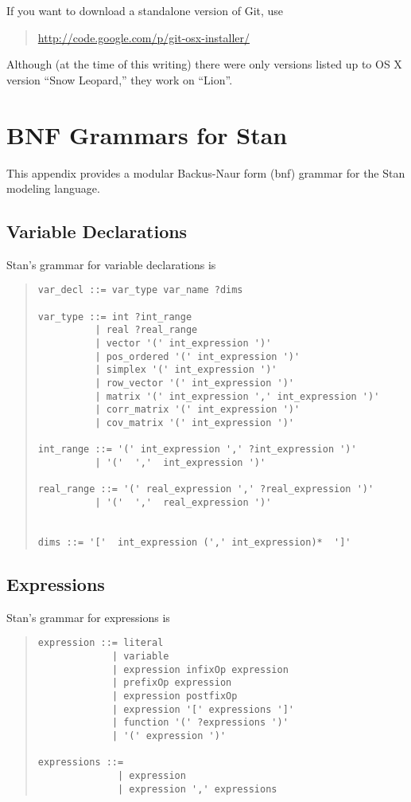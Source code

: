 \documentclass[10pt]{report}
\newcommand{\Stan}{Stan\xspace}
\newcommand{\acronym}[1]{{\sc #1}\xspace}
\newcommand{\BNF}{\acronym{bnf}}
\begin{document}
If you want to download a standalone version of Git, use

\begin{quote}
\url{http://code.google.com/p/git-osx-installer/}
\end{quote}

Although (at the time of this writing) there were only versions listed
up to OS X version ``Snow Leopard,'' they work on ``Lion''.

\chapter{BNF Grammars for \Stan}

This appendix provides a modular Backus-Naur form (\BNF) grammar for
the \Stan modeling language.

\section{Variable Declarations}

\Stan's grammar for variable declarations is
%
\begin{quote}
\begin{Verbatim}
var_decl ::= var_type var_name ?dims

var_type ::= int ?int_range
          | real ?real_range
          | vector '(' int_expression ')'
          | pos_ordered '(' int_expression ')'
          | simplex '(' int_expression ')'
          | row_vector '(' int_expression ')'
          | matrix '(' int_expression ',' int_expression ')'
          | corr_matrix '(' int_expression ')'
          | cov_matrix '(' int_expression ')'

int_range ::= '(' int_expression ',' ?int_expression ')'
          | '('  ','  int_expression ')'

real_range ::= '(' real_expression ',' ?real_expression ')'
          | '('  ','  real_expression ')'


dims ::= '['  int_expression (',' int_expression)*  ']'
\end{Verbatim}
\end{quote}

\section{Expressions}

\Stan's grammar for expressions is 
%
\begin{quote}
\begin{Verbatim}
expression ::= literal
             | variable
             | expression infixOp expression
             | prefixOp expression
             | expression postfixOp
             | expression '[' expressions ']'
             | function '(' ?expressions ')'
             | '(' expression ')'

expressions ::= 
              | expression
              | expression ',' expressions
\end{Verbatim}
\end{quote}
\end{document}
